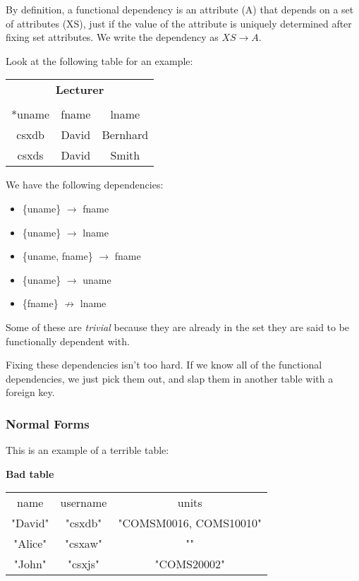 \documentclass[11pt,a4paper,titlepage,dvipsnames,cmyk]{scrartcl}
\begin{document}
By definition, a functional dependency is an attribute (A) that depends on a
set of attributes (XS), just if the value of the attribute is uniquely
determined after fixing set attributes. We write the dependency as $XS
\rightarrow A$.

Look at the following table for an example:

\begin{center}
    \begin{tabular}{c c c}
        \multicolumn{3}{c}{\textbf{Lecturer}} \\
        \multicolumn{3}{c}{} \\ \hline
        *uname & fname & lname \\ \hhline{===}
        csxdb & David & Bernhard \\ \hline
        csxds & David & Smith \\ \hline
    \end{tabular}
\end{center}

We have the following dependencies:
\begin{itemize}
    \item \{uname\} $\rightarrow$ fname
    \item \{uname\} $\rightarrow$ lname
    \item \{uname, fname\} $\rightarrow$ fname
    \item \{uname\} $\rightarrow$ uname
    \item \{fname\} $\not \rightarrow$ lname
\end{itemize}

Some of these are \textit{trivial} because they are already in the set
they are said to be functionally dependent with.

Fixing these dependencies isn't too hard. If we know all of the functional
dependencies, we just pick them out, and slap them in another table with a
foreign key.

\subsubsection{Normal Forms}%
\label{ssub:Normal-Forms}

This is an example of a terrible table:

\begin{center}
    \textbf{Bad table} 

    \begin{tabular}{c c c}
        \hline
        name & username & units \\ \hhline{===}
        "David" & "csxdb" & "COMSM0016, COMS10010" \\
        "Alice" & "csxaw" & "" \\
        "John" & "csxjs" & "COMS20002" \\ \hline
    \end{tabular}
\end{center}
\end{document}
